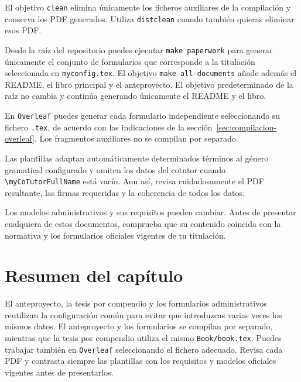 El objetivo \texttt{clean} elimina únicamente los ficheros auxiliares de la compilación y conserva los PDF generados. Utiliza \texttt{distclean} cuando también quieras eliminar esos PDF.

Desde la raíz del repositorio puedes ejecutar \texttt{make paperwork} para generar únicamente el conjunto de formularios que corresponde a la titulación seleccionada en \texttt{myconfig.tex}. El objetivo \texttt{make all-documents} añade además el README, el libro principal y el anteproyecto. El objetivo predeterminado de la raíz no cambia y continúa generando únicamente el README y el libro.

En \texttt{Overleaf} puedes generar cada formulario independiente seleccionando su fichero \texttt{.tex}, de acuerdo con las indicaciones de la sección~\ref{sec:compilacion-overleaf}. Los fragmentos auxiliares no se compilan por separado.

Las plantillas adaptan automáticamente determinados términos al género gramatical configurado y omiten los datos del cotutor cuando \texttt{\textbackslash{}myCoTutorFullName} está vacío. Aun así, revisa cuidadosamente el PDF resultante, las firmas requeridas y la coherencia de todos los datos.

Los modelos administrativos y sus requisitos pueden cambiar. Antes de presentar cualquiera de estos documentos, comprueba que su contenido coincida con la normativa y los formularios oficiales vigentes de tu titulación.


\section{Resumen del capítulo}
\label{sec:resumen-documentos-complementarios}

El anteproyecto, la tesis por compendio y los formularios administrativos reutilizan la configuración común para evitar que introduzcas varias veces los mismos datos. El anteproyecto y los formularios se compilan por separado, mientras que la tesis por compendio utiliza el mismo \texttt{Book/book.tex}. Puedes trabajar también en \texttt{Overleaf} seleccionando el fichero adecuado. Revisa cada PDF y contrasta siempre las plantillas con los requisitos y modelos oficiales vigentes antes de presentarlos.

